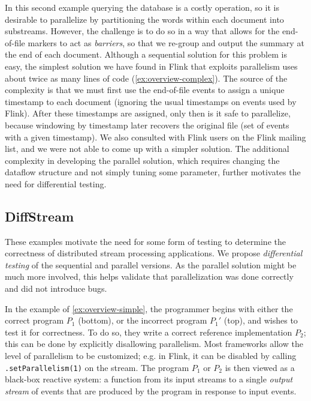 In this second example querying the database is a costly operation, so
it is desirable to parallelize by partitioning the words within each
document into substreams. However, the challenge is to do so in a way
that allows for the end-of-file markers to act as \emph{barriers}, so
that we re-group and output the summary at the end of each document.
Although a sequential solution for this problem is easy, the simplest
solution we have found in Flink that exploits parallelism uses about
twice as many lines of code
(\cref{ex:overview-complex}).
The source of the complexity is that we must first use the end-of-file events to assign a unique timestamp to each document (ignoring the usual timestamps on events used by Flink). After these timestamps are assigned, only then is it safe to parallelize, because windowing by timestamp later recovers the original file (set of events with a given timestamp).
We also consulted with Flink users
on the Flink mailing list, and we were not able to come up with a
simpler solution.
The additional complexity in
developing the parallel solution, which requires changing the dataflow
structure and not simply tuning some parameter, further motivates the
need for differential testing.

\subsection{DiffStream}
\label{ssec:overview-solution}

These examples motivate the need for some form of testing to determine
the correctness of distributed stream processing applications. We propose \emph{differential testing} of the sequential and parallel versions. As the parallel solution might be much more involved, this helps validate that parallelization was done correctly and did not introduce bugs.

In the example of \cref{ex:overview-simple}, the programmer begins with either the correct program $P_1$ (bottom), or the incorrect program $P_1'$ (top), and wishes to test it for correctness. To do so, they write a correct reference implementation $P_2$; this can be done by explicitly disallowing parallelism. Most frameworks allow the level of parallelism to be customized; e.g. in Flink, it can be disabled by calling \texttt{.setParallelism(1)} on the stream.
The program $P_1$ or $P_2$ is then viewed as a black-box reactive system: a function from its input streams to a single \emph{output stream} of events that are produced by the program in response to input events.

